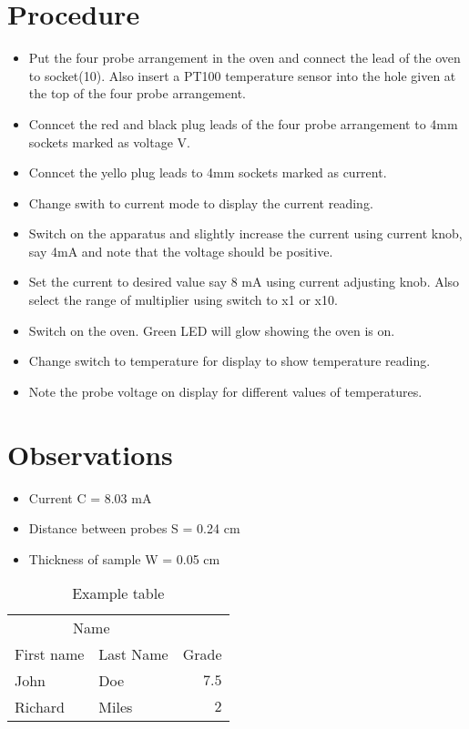 \documentclass[twoside,twocolumn]{article}
\begin{document}

\section{Procedure}


\begin{itemize}
\item Put the four probe arrangement in the oven and connect the lead of the oven to socket(10). Also insert a PT100 temperature sensor into the hole given at the top of the four probe arrangement. 
\item Conncet the red and black plug leads of the four probe arrangement to 4mm sockets marked as voltage V. 
\item Conncet the yello plug leads to 4mm sockets marked as current. 
\item Change swith to current mode to display the current reading. 
\item Switch on the apparatus and slightly increase the current using current knob, say 4mA and note that the voltage should be positive.
\item Set the current to desired value say 8 mA using current adjusting knob. Also select the range of multiplier using switch to x1 or x10.
\item Switch on the oven. Green LED will glow showing the oven is on. 
\item Change switch to temperature for display to show temperature reading. 
\item Note the probe voltage on display for different values of temperatures.
\end{itemize}


\section{Observations}

\begin{itemize}
\item Current C = 8.03 mA 
\item Distance between probes S = 0.24 cm
\item Thickness of sample W = 0.05 cm 
\end{itemize}
\begin{table}
\caption{Example table}
\centering
\begin{tabular}{llr}
\toprule
\multicolumn{2}{c}{Name} \\
\cmidrule(r){1-2}
First name & Last Name & Grade \\
\midrule
John & Doe & $7.5$ \\
Richard & Miles & $2$ \\
\bottomrule
\end{tabular}
\end{table}
\end{document}
